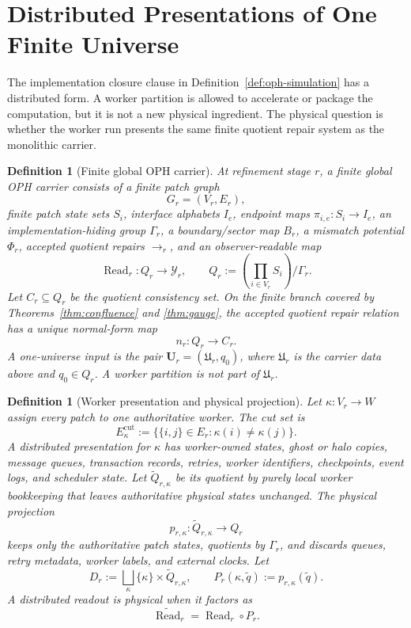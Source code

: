 \documentclass[11pt]{article}
\newtheorem{definition}[theorem]{Definition}
\theoremstyle{remark}
\theoremstyle{plain}
\begin{document}
\section{Distributed Presentations of One Finite Universe}
\label{sec:distributed-one-universe}

The implementation closure clause in Definition~\ref{def:oph-simulation} has a distributed
form. A worker partition is allowed to accelerate or package the computation, but it is not a
new physical ingredient. The physical question is whether the worker run presents the same
finite quotient repair system as the monolithic carrier.

\begin{definition}[Finite global OPH carrier]\label{def:finite-global-carrier}
At refinement stage \(r\), a finite global OPH carrier consists of a finite patch graph
\[
G_r=(V_r,E_r),
\]
finite patch state sets \(S_i\), interface alphabets \(I_e\), endpoint maps
\(\pi_{i,e}:S_i\to I_e\), an implementation-hiding group \(\Gamma_r\), a boundary/sector map
\(B_r\), a mismatch potential \(\Phi_r\), accepted quotient repairs \(\to_r\), and an
observer-readable map
\[
\operatorname{Read}_r:Q_r\to\mathcal Y_r,
\qquad
Q_r:=\left(\prod_{i\in V_r}S_i\right)/\Gamma_r.
\]
Let \(C_r\subseteq Q_r\) be the quotient consistency set. On the finite branch covered by
Theorems~\ref{thm:confluence} and \ref{thm:gauge}, the accepted quotient repair relation has a
unique normal-form map
\[
n_r:Q_r\to C_r.
\]
A one-universe input is the pair \(\mathbf U_r=(\mathfrak U_r,q_0)\), where
\(\mathfrak U_r\) is the carrier data above and \(q_0\in Q_r\). A worker partition is not part
of \(\mathfrak U_r\).
\end{definition}

\begin{definition}[Worker presentation and physical projection]\label{def:worker-presentation}
Let \(\kappa:V_r\to W\) assign every patch to one authoritative worker. The cut set is
\[
E_\kappa^{\mathrm{cut}}
:=
\bigl\{\{i,j\}\in E_r:\kappa(i)\ne\kappa(j)\bigr\}.
\]
A distributed presentation for \(\kappa\) has worker-owned states, ghost or halo copies,
message queues, transaction records, retries, worker identifiers, checkpoints, event logs, and
scheduler state. Let \(\widetilde Q_{r,\kappa}\) be its quotient by purely local worker
bookkeeping that leaves authoritative physical states unchanged. The physical projection
\[
p_{r,\kappa}:\widetilde Q_{r,\kappa}\to Q_r
\]
keeps only the authoritative patch states, quotients by \(\Gamma_r\), and discards queues, retry
metadata, worker labels, and external clocks. Let
\[
D_r:=\bigsqcup_{\kappa}\{\kappa\}\times\widetilde Q_{r,\kappa},
\qquad
P_r(\kappa,\tilde q):=p_{r,\kappa}(\tilde q).
\]
A distributed readout is physical when it factors as
\[
\widetilde{\operatorname{Read}}_r=\operatorname{Read}_r\circ P_r.
\]
\end{definition}
\end{document}
